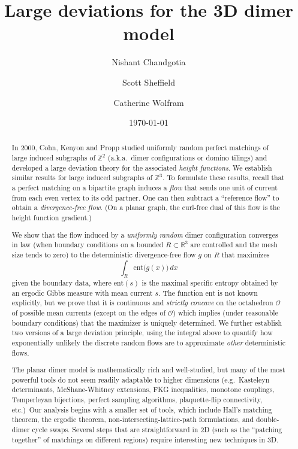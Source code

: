 \documentclass[11pt]{article}
\title{Large deviations for the 3D dimer model}
\author[1]{Nishant Chandgotia}
\affil[1]{Tata Institute of Fundamental Research - Centre for Applicable Mathematics}
\author[2]{Scott Sheffield}
\affil[2]{Massachusetts Institute of Technology}
\author[3]{Catherine Wolfram}
\affil[3]{ETH Z\"urich and Yale University}
\date{\today}
\theoremstyle{remark}
\theoremstyle{definition}
\newcommand{\ent}{\text{ent}}
\begin{document}
\maketitle 
\begin{abstract}
In 2000, Cohn, Kenyon and Propp studied uniformly random perfect matchings of large induced subgraphs of $\mathbb Z^2$ (a.k.a.\ dimer configurations or domino tilings) and developed a large deviation theory for the associated {\em height functions}. We establish similar results for large induced subgraphs of $\mathbb Z^3$. To formulate these results, recall that a perfect matching on a bipartite graph induces a {\em flow} that sends one unit of current from each even vertex to its odd partner. One can then subtract a ``reference flow'' to obtain a {\em divergence-free flow}. (On a planar graph, the curl-free dual of this flow is the height function gradient.)

We show that the flow induced by a {\em uniformly random} dimer configuration converges in law (when boundary conditions on a bounded $R \subset \mathbb R^3$ are controlled and the mesh size tends to zero) to the deterministic divergence-free flow $g$ on $R$ that maximizes 
    $$\int_{R} \ent\big(g(x)\bigr) \,dx$$
given the boundary data, where $\ent(s)$ is the maximal specific entropy obtained by an ergodic Gibbs measure with mean current $s$. The function $\ent$ is not known explicitly, but we prove that it is continuous and {\em strictly concave} on the octahedron $\mathcal O$ of possible mean currents (except on the edges of $\mathcal O$) which implies (under reasonable boundary conditions) that the maximizer is uniquely determined. We further establish two versions of a large deviation principle, using the integral above to quantify how exponentially unlikely the discrete random flows are to approximate {\em other} deterministic flows.

The planar dimer model is mathematically rich and well-studied, but many of the most powerful tools do not seem readily adaptable to higher dimensions (e.g.\ Kasteleyn determinants, McShane-Whitney extensions, FKG inequalities, monotone couplings, Temperleyan bijections, perfect sampling algorithms, plaquette-flip connectivity, etc.)\ Our analysis begins with a smaller set of tools, which include Hall's matching theorem, the ergodic theorem, non-intersecting-lattice-path formulations, and double-dimer cycle swaps. Several steps that are straightforward in 2D (such as the ``patching together'' of matchings on different regions) require interesting new techniques in 3D.
\end{abstract}
\end{document}
